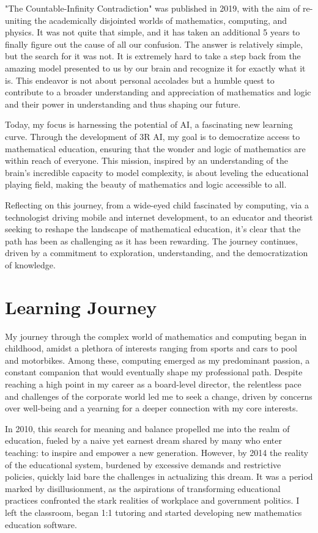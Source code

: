 \documentclass[12pt]{article}
\begin{document}
"The Countable-Infinity Contradiction" was published in 2019, with the aim of re-uniting the academically disjointed worlds of mathematics, computing, and physics. It was not quite that simple, and it has taken an additional 5 years to finally figure out the cause of all our confusion. The answer is relatively simple, but the search for it was not. It is extremely hard to take a step back from the amazing model presented to us by our brain and recognize it for exactly what it is. This endeavor is not about personal accolades but a humble quest to contribute to a broader understanding and appreciation of mathematics and logic and their power in understanding and thus shaping our future.

Today, my focus is harnessing the potential of AI, a fascinating new learning curve. Through the development of 3R AI, my goal is to democratize access to mathematical education, ensuring that the wonder and logic of mathematics are within reach of everyone. This mission, inspired by an understanding of the brain's incredible capacity to model complexity, is about leveling the educational playing field, making the beauty of mathematics and logic accessible to all.

Reflecting on this journey, from a wide-eyed child fascinated by computing, via a technologist driving mobile and internet development, to an educator and theorist seeking to reshape the landscape of mathematical education, it's clear that the path has been as challenging as it has been rewarding. The journey continues, driven by a commitment to exploration, understanding, and the democratization of knowledge.

\section*{Learning Journey}
My journey through the complex world of mathematics and computing began in childhood, amidst a plethora of interests ranging from sports and cars to pool and motorbikes. Among these, computing emerged as my predominant passion, a constant companion that would eventually shape my professional path. Despite reaching a high point in my career as a board-level director\cite{Ed2002DNA}, the relentless pace and challenges of the corporate world led me to seek a change, driven by concerns over well-being and a yearning for a deeper connection with my core interests.

In 2010, this search for meaning and balance propelled me into the realm of education\cite{Ed2012MATHS}, fueled by a naive yet earnest dream shared by many who enter teaching: to inspire and empower a new generation. However, by 2014 the reality of the educational system, burdened by excessive demands and restrictive policies, quickly laid bare the challenges in actualizing this dream. It was a period marked by disillusionment, as the aspirations of transforming educational practices confronted the stark realities of workplace and government politics. I left the classroom, began 1:1 tutoring and started developing new mathematics education software.
\end{document}
